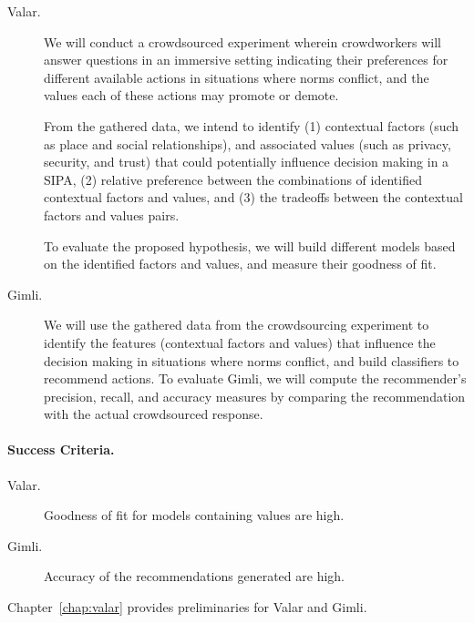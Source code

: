 \documentclass[11pt,          %
               phd,           %
               onehalfspacing %
               ]{ncsuthesis}
\newcommand{\frameworkC}{Valar\xspace}
\newcommand{\frameworkD}{Gimli\xspace}
\newcounter{hypothesis}
\begin{document}
\begin{description}

\item[\frameworkC.] We will conduct a crowdsourced experiment wherein
crowdworkers will answer questions in an immersive setting indicating
their preferences for different available actions in situations where
norms conflict, and the values each of these actions may promote or
demote.

From the gathered data, we intend to identify (1) contextual factors
(such as place and social relationships), and associated values (such as
privacy, security, and trust) that could potentially influence decision
making in a SIPA, (2) relative preference between the combinations of
identified contextual factors and values, and (3) the tradeoffs between
the contextual factors and values pairs.

To evaluate the proposed hypothesis, we will build different models
based on the identified factors and values, and measure their goodness of fit.

\item[\frameworkD.] We will use the gathered data from the
crowdsourcing experiment to identify the features (contextual factors
and values) that influence the decision making in situations where norms
conflict, and build classifiers to recommend actions. To evaluate
\frameworkD, we will compute the recommender's precision, recall, and
accuracy measures by comparing the recommendation with the actual
crowdsourced response.

\end{description}


\paragraph*{Success Criteria.}
\begin{description}
\item[\frameworkC.] Goodness of fit for models containing values are high. 
\item[\frameworkD.] Accuracy of the recommendations generated are high. 
\end{description}

Chapter~\ref{chap:valar} provides preliminaries for \frameworkC and \frameworkD. 
\end{document}
